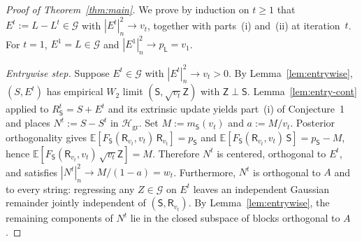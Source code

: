\documentclass[11pt]{article}
\theoremstyle{plain}
\theoremstyle{definition}
\theoremstyle{remark}
\newcommand{\E}{\mathbb{E}}
\newcommand{\sL}{\mathsf{L}}
\newcommand{\sS}{\mathsf{S}}
\newcommand{\sR}{\mathsf{R}}
\newcommand{\sZ}{\mathsf{Z}}
\begin{document}
\begin{proof}[Proof of Theorem~\ref{thm:main}]
We prove by induction on $t \ge 1$ that $E^t := L - L^t \in \mathcal{G}$ with $|E^t|_n^2 \to v_t$, together with parts~(i) and~(ii) at iteration~$t$. For $t = 1$, $E^1 = L \in \mathcal{G}$ and $|E^1|_n^2 \to p_{\sL} = v_1$.

\emph{Entrywise step.} Suppose $E^t \in \mathcal{G}$ with $|E^t|_n^2 \to v_t > 0$. By Lemma~\ref{lem:entrywise}, $(S, E^t)$ has empirical $W_2$ limit $(\sS, \sqrt{v_t}\sZ)$ with $\sZ \perp \sS$. Lemma~\ref{lem:entry-cont} applied to $R_{\sS}^t = S + E^t$ and its extrinsic update yields part~(i) of Conjecture~1 and places $N^t := S - S^t$ in $\mathcal{H}_{\mathrm{gr}}$. Set $M := m_{\sS}(v_t)$ and $a := M/v_t$. Posterior orthogonality gives $\E[F_{\sS}(\sR_{v_t}, v_t)\,\sR_{v_t}] = p_{\sS}$ and $\E[F_{\sS}(\sR_{v_t}, v_t)\,\sS] = p_{\sS} - M$, hence $\E[F_{\sS}(\sR_{v_t}, v_t)\,\sqrt{v_t}\sZ] = M$. Therefore $N^t$ is centered, orthogonal to $E^t$, and satisfies $|N^t|_n^2 \to M/(1 - a) = w_t$. Furthermore, $N^t$ is orthogonal to $A$ and to every string: regressing any $Z \in \mathcal{G}$ on $E^t$ leaves an independent Gaussian remainder jointly independent of $(\sS, \sR_{v_t})$. By Lemma~\ref{lem:entrywise}, the remaining components of $N^t$ lie in the closed subspace of blocks orthogonal to $A$.


\end{proof}
\end{document}
